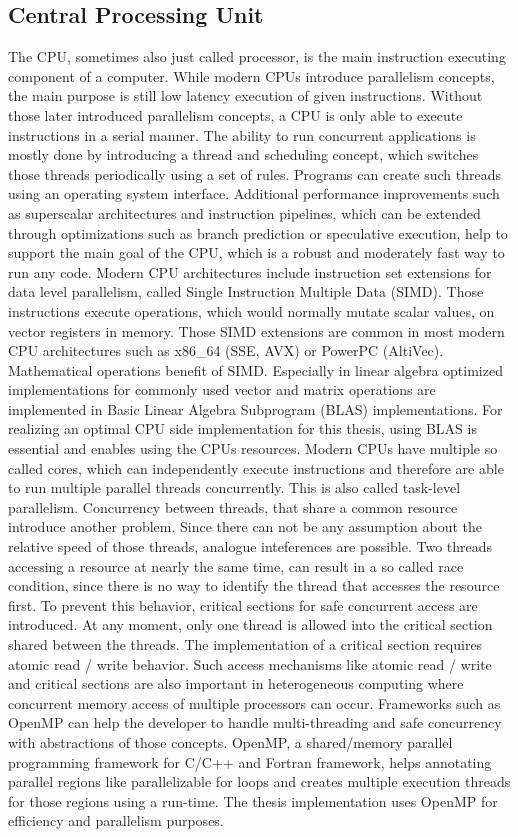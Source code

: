 \subsection{Central Processing Unit}
The CPU, sometimes also just called processor, is the main instruction executing component of a computer. While modern CPUs introduce parallelism concepts, the main purpose is still low latency execution of given instructions.
Without those later introduced parallelism concepts, a CPU is only able to execute instructions in a serial manner. The ability to run concurrent applications is mostly done by introducing a thread and scheduling concept, which switches those threads periodically using a set of rules. Programs can create such threads using an operating system interface.
Additional performance improvements such as superscalar architectures and instruction pipelines, which can be extended through optimizations such as branch prediction or speculative execution, help to support the main goal of the CPU, which is a robust and moderately fast way to run any code.
Modern CPU architectures include instruction set extensions for data level parallelism, called Single Instruction Multiple Data (SIMD). Those instructions execute operations, which would normally mutate scalar values, on vector registers in memory. Those SIMD extensions are common in most modern CPU architectures such as x86\_64 (SSE, AVX) or PowerPC (AltiVec). Mathematical operations benefit of SIMD. Especially in linear algebra optimized implementations for commonly used vector and matrix operations are implemented in Basic Linear Algebra Subprogram (BLAS) implementations. For realizing an optimal CPU side implementation for this thesis, using BLAS is essential and enables using the CPUs resources.
Modern CPUs have multiple so called cores, which can independently execute instructions and therefore are able to run multiple parallel threads concurrently. This is also called task-level parallelism.
Concurrency between threads, that share a common resource introduce another problem. Since there can not be any assumption about the relative speed of those threads, analogue inteferences are possible. Two threads accessing a resource at nearly the same time, can result in a so called race condition, since there is no way to identify the thread that accesses the resource first. To prevent this behavior, critical sections for safe concurrent access are introduced. At any moment, only one thread is allowed into the critical section shared between the threads. The implementation of a critical section requires atomic read / write behavior.
Such access mechanisms like atomic read / write and critical sections are also important in heterogeneous computing where concurrent memory access of multiple processors can occur.
Frameworks such as OpenMP can help the developer to handle multi-threading and safe concurrency with abstractions of those concepts. OpenMP, a shared/memory parallel programming framework for C/C++ and Fortran framework, helps annotating parallel regions like parallelizable for loops and creates multiple execution threads for those regions using a run-time.
The thesis implementation uses OpenMP for efficiency and parallelism purposes.

